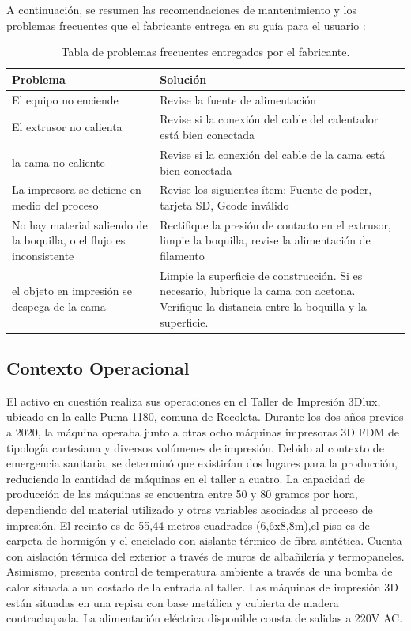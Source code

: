 A continuación, se resumen las recomendaciones de mantenimiento y los problemas frecuentes que el fabricante entrega en su guía para el usuario \citep{germanreprap2019}:

\begin{table}[H]
  \centering
 
    \begin{tabular}{|p{9.215em}|p{19.645em}|}
	\hline    
    Problema & \multicolumn{1}{l}{Solución} \\
	\hline    
    El equipo no enciende & Revise la fuente de alimentación \\
	\hline    
    El extrusor no calienta & Revise si la conexión del cable del calentador está bien conectada \\
	\hline    
    la cama no caliente & Revise si la conexión del cable de la cama está bien conectada \\
	\hline    
    La impresora se detiene en medio del proceso & Revise los siguientes ítem: Fuente de poder, tarjeta SD, Gcode inválido \\
	\hline    
    No hay material saliendo de la boquilla, o el flujo es inconsistente & Rectifique la presión de contacto en el extrusor, limpie la boquilla, revise la alimentación de filamento \\
	\hline    
    el objeto en impresión se despega de la cama & Limpie la superficie de construcción. Si es necesario, lubrique la cama con acetona. Verifique la distancia entre la boquilla y la superficie.  \\
	\hline    
    \end{tabular}%
     \caption{Tabla de problemas frecuentes entregados por el fabricante.}
  \label{tab:addlabel}%
\end{table}%


\subsection{Contexto Operacional}

El activo en cuestión realiza sus operaciones en el Taller de Impresión 3Dlux, ubicado en la calle Puma 1180, comuna de Recoleta. Durante los dos años previos a 2020, la máquina operaba junto a otras ocho máquinas impresoras 3D FDM de tipología cartesiana y diversos volúmenes de impresión. Debido al contexto de emergencia sanitaria, se determinó que existirían dos lugares para la producción, reduciendo la cantidad de máquinas en el taller a cuatro. La capacidad de producción de las máquinas se encuentra entre 50 y 80 gramos por hora, dependiendo del material utilizado y otras variables asociadas al proceso de impresión. El recinto es de 55,44 metros cuadrados (6,6x8,8m),el piso  es de carpeta de hormigón y el encielado con aislante térmico de fibra sintética. Cuenta con aislación térmica del exterior a través de muros de albañilería y termopaneles. Asimismo, presenta control de temperatura ambiente a través de una bomba de calor situada a un costado de la entrada al taller. Las máquinas de impresión 3D están situadas en una repisa con base metálica y cubierta de madera contrachapada. La alimentación eléctrica disponible consta de salidas a 220V AC.

